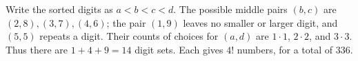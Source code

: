Write the sorted digits as $a<b<c<d$. The possible middle pairs $(b,c)$ are $(2,8),(3,7),(4,6)$; the pair $(1,9)$ leaves no smaller or larger digit, and $(5,5)$ repeats a digit. Their counts of choices for $(a,d)$ are $1\cdot1$, $2\cdot2$, and $3\cdot3$. Thus there are $1+4+9=14$ digit sets. Each gives $4!$ numbers, for a total of $\boxed{336}$.
